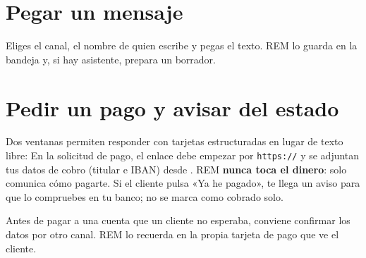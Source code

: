 \section{Pegar un mensaje}
Eliges el canal, el nombre de quien escribe y pegas el texto. REM lo guarda en la bandeja y, si hay asistente, prepara un borrador.

\section{Pedir un pago y avisar del estado}
Dos ventanas permiten responder con tarjetas estructuradas en lugar de texto libre:
En la solicitud de pago, el enlace debe empezar por \texttt{https://} y se adjuntan tus datos de cobro (titular e IBAN) desde . REM \textbf{nunca toca el dinero}: solo comunica cómo pagarte. Si el cliente pulsa «Ya he pagado», te llega un aviso para que lo compruebes en tu banco; no se marca como cobrado solo.

\begin{warnbox}
Antes de pagar a una cuenta que un cliente no esperaba, conviene confirmar los datos por otro canal. REM lo recuerda en la propia tarjeta de pago que ve el cliente.
\end{warnbox}
